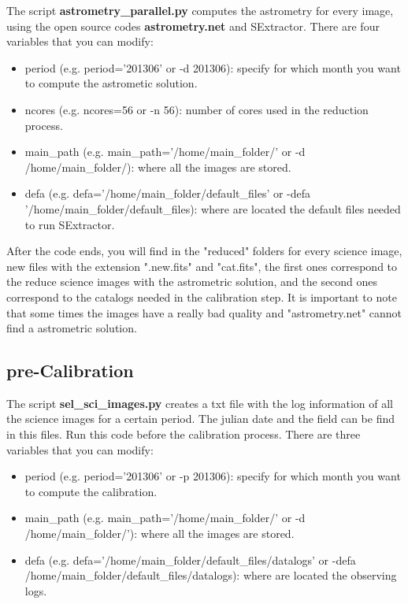 \documentclass[letter, 12pt]{article}
\begin{document}
The script \textbf{astrometry\_parallel.py} computes the astrometry for every image, using the open source codes  \textbf{astrometry.net} and SExtractor.  There are four variables that you can modify: 

\begin{itemize}

\item period (e.g. period='201306' or -d 201306): specify for which month you want to compute the astrometic solution.

\item ncores (e.g. ncores=56  or -n 56): number of cores used in the reduction process.


\item main\_path (e.g. main\_path='/home/main\_folder/' or -d /home/main\_folder/): where all the images are stored.

\item defa (e.g. defa='/home/main\_folder/default\_files'  or -defa '/home/main\_folder/default\_files): where are located the default files needed to run SExtractor.

\end{itemize}

After the code ends, you will find in the "reduced" folders for every science image, new files with the extension ".new.fits" and "cat.fits", the first ones correspond to the reduce science images with the astrometric solution, and the second ones correspond to the catalogs needed in the calibration step. It is important to note that some times the images have a really bad quality and "astrometry.net" cannot find a astrometric solution.

\subsection{pre-Calibration}

The script  \textbf{sel\_sci\_images.py} creates a txt file with the log information of all the science images for a certain period. The julian date and the field can be find in this files. Run this code before the calibration process. 
There are three variables that you can modify: 

\begin{itemize}

\item period (e.g. period='201306' or -p 201306): specify for which month you want to compute the calibration.

\item main\_path (e.g. main\_path='/home/main\_folder/' or -d /home/main\_folder/'): where all the images are stored.

\item defa (e.g. defa='/home/main\_folder/default\_files/datalogs' or -defa /home/main\_folder/default\_files/datalogs): where are located the observing logs.

\end{itemize}
\end{document}
